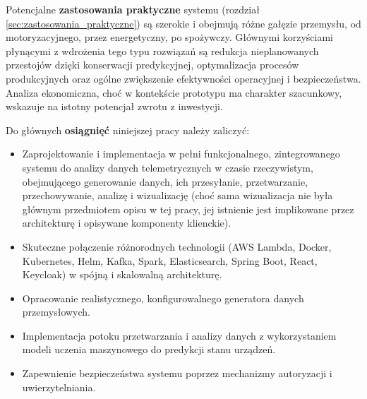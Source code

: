 Potencjalne \textbf{zastosowania praktyczne} systemu (rozdział \ref{sec:zastosowania_praktyczne}) są szerokie i obejmują różne gałęzie przemysłu, od motoryzacyjnego, przez energetyczny, po spożywczy. Głównymi korzyściami płynącymi z wdrożenia tego typu rozwiązań są redukcja nieplanowanych przestojów dzięki konserwacji predykcyjnej, optymalizacja procesów produkcyjnych oraz ogólne zwiększenie efektywności operacyjnej i bezpieczeństwa. Analiza ekonomiczna, choć w kontekście prototypu ma charakter szacunkowy, wskazuje na istotny potencjał zwrotu z inwestycji.

Do głównych \textbf{osiągnięć} niniejszej pracy należy zaliczyć:
\begin{itemize}
    \item Zaprojektowanie i implementacja w pełni funkcjonalnego, zintegrowanego systemu do analizy danych telemetrycznych w czasie rzeczywistym, obejmującego generowanie danych, ich przesyłanie, przetwarzanie, przechowywanie, analizę i wizualizację (choć sama wizualizacja nie była głównym przedmiotem opisu w tej pracy, jej istnienie jest implikowane przez architekturę i opisywane komponenty klienckie).
    \item Skuteczne połączenie różnorodnych technologii (AWS Lambda, Docker, Kubernetes, Helm, Kafka, Spark, Elasticsearch, Spring Boot, React, Keycloak) w spójną i skalowalną architekturę.
    \item Opracowanie realistycznego, konfigurowalnego generatora danych przemysłowych.
    \item Implementacja potoku przetwarzania i analizy danych z wykorzystaniem modeli uczenia maszynowego do predykcji stanu urządzeń.
    \item Zapewnienie bezpieczeństwa systemu poprzez mechanizmy autoryzacji i uwierzytelniania.
\end{itemize}

